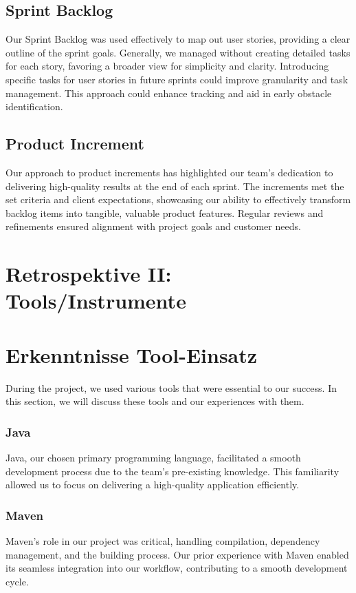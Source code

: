 \subsection{Sprint Backlog}
Our Sprint Backlog was used effectively to map out user stories, providing a clear outline of the sprint goals.
Generally, we managed without creating detailed tasks for each story, favoring a broader view for simplicity and clarity.
Introducing specific tasks for user stories in future sprints could improve granularity and task management.
This approach could enhance tracking and aid in early obstacle identification.

\subsection{Product Increment}
Our approach to product increments has highlighted our team's dedication to delivering high-quality results at the end of each sprint.
The increments met the set criteria and client expectations, showcasing our ability to effectively transform backlog items into tangible, valuable product features.
Regular reviews and refinements ensured alignment with project goals and customer needs.


\section{Retrospektive II: Tools/Instrumente}

\section{Erkenntnisse Tool-Einsatz}
During the project, we used various tools that were essential to our success.
In this section, we will discuss these tools and our experiences with them.

\subsubsection{Java}
Java, our chosen primary programming language, facilitated a smooth development process due to the team's pre-existing knowledge.
This familiarity allowed us to focus on delivering a high-quality application efficiently.

\subsubsection{Maven}
Maven's role in our project was critical, handling compilation, dependency management, and the building process.
Our prior experience with Maven enabled its seamless integration into our workflow, contributing to a smooth development cycle.

